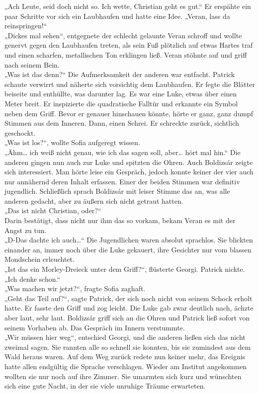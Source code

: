 \documentclass[oneside]{memoir}
\begin{document}
„Ach Leute, seid doch nicht so. Ich wette, Christian geht es gut.“
Er erspähte ein paar Schritte vor sich ein Laubhaufen und hatte eine Idee.
„Veran, lass da reinspringen!“ \\
„Dickes mal sehen“, entgegnete der schlecht gelaunte Veran schroff und wollte genervt gegen den Laubhaufen treten, als sein Fuß plötzlich auf etwas Hartes traf und einen scharfen, metallischen Ton erklingen ließ.
Veran stöhnte auf und griff nach seinem Bein.  \\
„Was ist das denn?“
Die Aufmerksamkeit der anderen war entfacht. Patrick schaute verwirrt und näherte sich vorsichtig dem Laubhaufen. Er fegte die Blätter beiseite und enthüllte, was darunter lag. Es war eine Luke, etwas über einen Meter breit. Er inspizierte die quadratische Falltür und erkannte ein Symbol neben dem Griff. Bevor er genauer hinschauen könnte, hörte er ganz, ganz dumpf Stimmen aus dem Inneren. Dann, einen Schrei. Er schreckte zurück, sichtlich geschockt. \\
„Was ist los?“, wollte Sofia aufgeregt wissen. \\
„Ähm\ldots{} ich weiß nicht genau, wie ich das sagen soll, aber\ldots{} hört mal hin.“
Die anderen gingen nun auch zur Luke und spitzten die Ohren. Auch Boldizsár zeigte sich interessiert.
Man hörte leise ein Gespräch, jedoch konnte keiner der vier auch nur annähernd deren Inhalt erfassen. Einer der beiden Stimmen war definitiv jugendlich. Schließlich sprach Boldizsár mit leiser Stimme das an, was alle anderen gedacht, aber zu äußern sich nicht getraut hatten. \\
„Das ist nicht Christian, oder?“ \\
Darin bestätigt, dass nicht nur ihm das so vorkam, bekam Veran es mit der Angst zu tun. \\
„D-Das dachte ich auch\ldots“
Die Jugendlichen waren absolut sprachlos. Sie blickten einander an, immer noch über die Luke gekauert, ihre Gesichter nur vom blassen Mondschein erleuchtet. \\
„Ist das ein Morley-Dreieck unter dem Griff?“, flüsterte Georgi. Patrick nickte. \\
„Ich denke schon.“ \\
„Was machen wir jetzt?“, fragte Sofia zaghaft. \\
„Geht das Teil auf?“, sagte Patrick, der sich noch nicht von seinem Schock erholt hatte. Er fasste den Griff und zog leicht. Die Luke gab zwar deutlich nach, ächzte aber laut, sehr laut. Boldizsár griff sich an die Ohren und Patrick ließ sofort von seinem Vorhaben ab. Das Gespräch im Innern verstummte.  \\
„Wir müssen hier weg“, entschied Georgi, und die anderen ließen sich das nicht zweimal sagen. Sie rannten alle so schnell sie konnten, bis sie zumindest aus dem Wald heraus waren.
Auf dem Weg zurück redete nun keiner mehr, das Ereignis hatte allen endgültig die Sprache verschlagen. Wieder am Institut angekommen wollten sie nur noch auf ihre Zimmer. Sie umarmten sich kurz und wünschten sich eine gute Nacht, in der sie viele unruhige Träume erwarteten. \\
\end{document}
